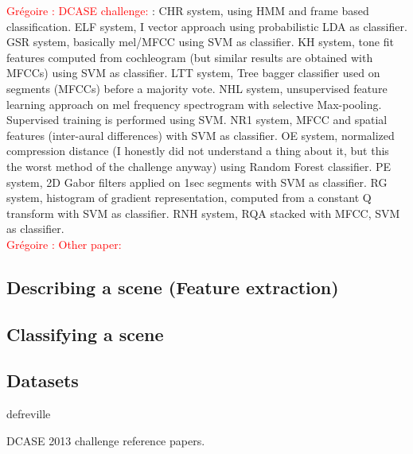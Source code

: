 \documentclass[journal]{IEEEtran}
\newcommand{\gl}[1]{\textcolor{red}{Gr\'egoire : #1}}
\begin{document}
\gl{DCASE challenge:} \cite{chum2013ieee}: CHR system, using HMM and frame based classification. \cite{elizalde2013vector} ELF system, I vector approach using probabilistic LDA as classifier. \cite{geiger2013large} GSR system, basically mel/MFCC using SVM as classifier. \cite{krijnders2013tone} KH system, tone fit features computed from cochleogram (but similar results are obtained with MFCCs) using SVM as classifier. \cite{li2013auditory} LTT system, Tree bagger classifier used on segments (MFCCs) before a majority vote. \cite{lee2013acoustic} NHL system, unsupervised feature learning approach on mel frequency spectrogram with selective Max-pooling. Supervised training is performed using SVM. \cite{nogueira2013sound} NR1 system, MFCC and spatial features (inter-aural differences) with SVM as classifier. \cite{olivetti2013wonder} OE system, normalized compression distance (I honestly did not understand a thing about it, but this the worst method of the challenge anyway) using  Random Forest  classifier.  \cite{patil2013multiresolution} PE system, 2D Gabor filters applied on 1sec segments with SVM as classifier.  \cite{rakotomamonjy2015histogram} RG system, histogram of gradient representation, computed from a constant Q transform with SVM as classifier.  \cite{roma2013recurrence} RNH system, RQA stacked with MFCC, SVM as classifier. \\

\gl{Other paper:} \cite{jiang2005svm, kalinli2009saliency, su2011environmental, barchiesi2015acoustic, ye2015acoustic, bisot2015hog, chakrabarty2015exploring, xue2015auditory, bisot2016acoustic}

\subsection{Describing a scene (Feature extraction)}

\subsection{Classifying a scene}

\subsection{Datasets}

defreville \cite{aucouturier2007bag}

\cite{lagrange:hal-01082501}

DCASE 2013 challenge reference papers. \cite{giannoulis2013database, 7100934} \\
\end{document}
